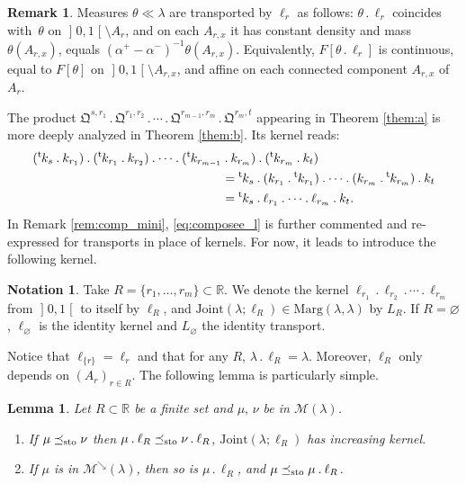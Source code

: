 \documentclass[JEP,XML,SOM,Unicode,NoEqCountersInSection,NoFloatCountersInSection,published]{cedram}
\newcommand{\ldot}{\mathbin{.}}
\newcommand{\lcdots}{\ldot\cdots\ldot}
\theoremstyle{plain}
\newtheorem{lem}[them]{Lemma}
\theoremstyle{definition}
\newtheorem{notation}[them]{Notation} %
\newtheorem{rem}[them]{Remark}
\newcommand{\join}{\mathrm{Joint}}
\newcommand{\como}{\mathfrak{Q}}
\newcommand{\trans}{{}^{\mathrm{t}}\mkern-1mu}
\newcommand{\la}{\lambda}
\newcommand{\m}{\mathcal{M}}
\newcommand{\ma}{\mathrm{Marg}}
\newcommand{\R}{\mathbb{R}}
\newcommand{\leqs}{\preceq_{\text{\rm sto}}}
\newcommand{\mdec}{\mathcal{M}^{\scriptscriptstyle\searrow}}
\newcommand{\op}{\mathopen}
\newcommand{\clo}{\mathclose}
\begin{document}
\begin{rem}\label{rem:action_l}Measures $\theta\ll \la$ are transported by $\ell_r$ as follows: $\theta\ldot \ell_r$ coincides with~$\theta$ on $\op]0,1\clo[\setminus A_r$, and on each $A_{r,x}$ it has constant density and mass $\theta(A_{r,x})$, \ie equals $(\alpha^+-\alpha^-)^{-1}\theta(A_{r,x})$. Equivalently, $F[\theta\ldot \ell_r]$ is continuous, equal to $F[\theta]$ on $\op]0,1\clo[\setminus A_{r,x}$, and affine on each connected component $A_{r,x}$ of $A_r$.
\end{rem}

The product $\como^{s,r_1}{}\ldot\como^{r_1,r_2}\lcdots \como^{r_{m-1},r_m}{}\ldot\como^{r_m,t}$ appearing in Theorem \ref{them:a} is more deeply analyzed in Theorem \ref{them:b}. Its kernel reads:
\begin{equation}\label{eq:composee_l}
\begin{aligned}
(\trans k_s\ldot k_{r_1})\ldot(\trans k_{r_1}{}\ldot k_{r_2})\lcdots (\trans k_{r_{m-1}}&\ldot k_{r_m})\ldot(\trans k_{r_m}{}\ldot k_t)\\
&= \trans k_s\ldot(k_{r_1}{}\ldot\trans k_{r_1})\lcdots (k_{r_m}{}\ldot\trans k_{r_m})\ldot k_t\\
&=\trans k_s\ldot\ell_{r_1}\lcdots \ell_{r_m}{}\ldot k_t.
\end{aligned}
\end{equation}
In Remark \ref{rem:comp_mini}, \eqref{eq:composee_l} is further commented and re-expressed for transports in place of kernels. For now, it leads to introduce the following kernel.

\begin{notation}\label{notation:Ts}
Take $R=\{r_1,\ldots,r_m\}\!\subset\!\R$. We denote the kernel \hbox{$\ell_{r_1}{}\ldot\ell_{r_2}{}\ldot\cdots\ldot\ell_{r_m}$} from $\op]0,1\clo[$ to itself by $\ell_R$, and $\join(\la;\ell_R)\in\ma(\la,\la)$ by $L_R$. If $R=\varnothing$, $\ell_\varnothing$ is the identity kernel and $L_\varnothing$ the identity transport.
\end{notation}

Notice that $\ell_{\{r\}}=\ell_r$ and that for any $R$, $\la\ldot\ell_R=\la$. Moreover, $\ell_R$ only depends on $(A_r)_{r\in R}$. The following lemma is particularly simple.

\begin{lem}\label{lem:mono1}
Let $R\subset \R$ be a finite set and $\mu,\,\nu$ be in $\m(\la)$.

\begin{enumerate}
\item
\label{item:mono1a} If $\mu\leqs \nu$ then $\mu \ldot\ell_R\leqs \nu\ldot\ell_R$, \ie $\join(\la; \ell_R)$ has increasing kernel.
\item
\label{item:mono1b} If $\mu$ is in $\mdec(\la)$, then so is $\mu \ldot\ell_R$, and $\mu\leqs \mu\ldot\ell_R$.
\end{enumerate}
\end{lem}
\end{document}
